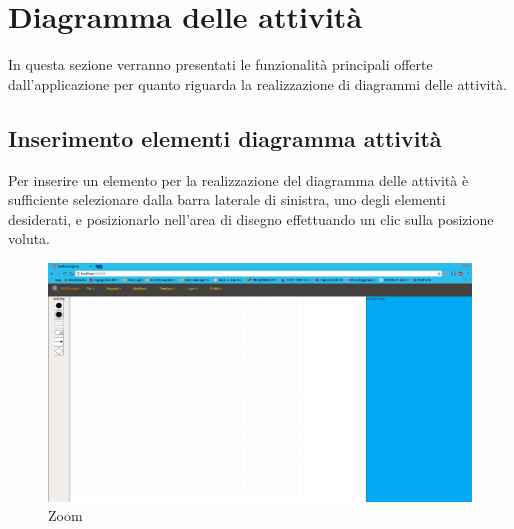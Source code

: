 \section{Diagramma delle attività}
In questa sezione verranno presentati le funzionalità principali offerte dall'applicazione per quanto riguarda la realizzazione di diagrammi delle attività.

\subsection{Inserimento elementi diagramma attività}
Per inserire un elemento per la realizzazione del diagramma delle attività è sufficiente selezionare dalla barra laterale di sinistra, uno degli elementi desiderati, e posizionarlo nell'area di disegno effettuando un clic sulla posizione voluta.

\begin{figure}[h!]
	\centering
		\includegraphics[scale=0.22]{res/img/editActivity.png}
	\caption{Zoom}
\end{figure}
